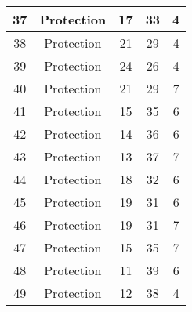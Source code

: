 \documentclass[results.tex]{subfiles}
\begin{document}
\begin{center}
\begin{tabular}{| c || c | c | c | c |}
            \hline
            37                      & Protection                   & 17                     & 33                      & 4                    \\
            \hline
            38                      & Protection                   & 21                     & 29                      & 4                    \\
            \hline
            39                      & Protection                   & 24                     & 26                      & 4                    \\
            \hline
            40                      & Protection                   & 21                     & 29                      & 7                    \\
            \hline
            41                      & Protection                   & 15                     & 35                      & 6                    \\
            \hline
            42                      & Protection                   & 14                     & 36                      & 6                    \\
            \hline
            43                      & Protection                   & 13                     & 37                      & 7                    \\
            \hline
            44                      & Protection                   & 18                     & 32                      & 6                    \\
            \hline
            45                      & Protection                   & 19                     & 31                      & 6                    \\
            \hline
            46                      & Protection                   & 19                     & 31                      & 7                    \\
            \hline
            47                      & Protection                   & 15                     & 35                      & 7                    \\
            \hline
            48                      & Protection                   & 11                     & 39                      & 6                    \\
            \hline
            49                      & Protection                   & 12                     & 38                      & 4                    \\
            \hline
        \end{tabular}
    \end{center}
\end{document}
